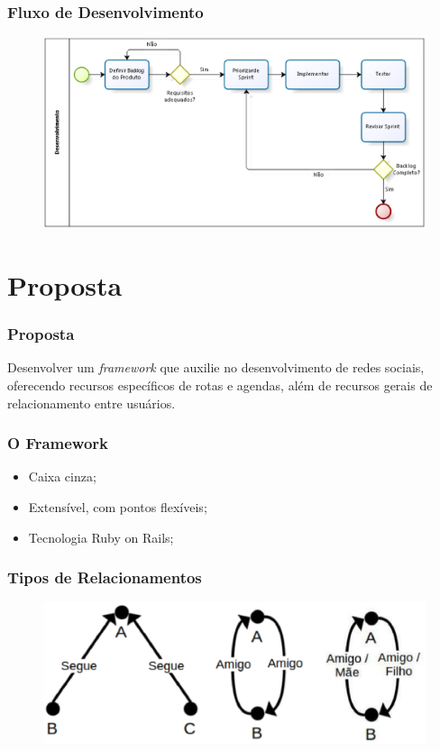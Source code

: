 \documentclass{beamer}
\begin{document}
\begin{frame}
\frametitle{Fluxo de Desenvolvimento}

\begin{figure}[h]
	\centering
	\includegraphics[scale=0.35]{../figuras/capitulo4/processo_desenvolvimento.eps}
\end{figure}

\end{frame}

\section{Proposta}

\begin{frame}
\frametitle{Proposta}

Desenvolver um \textit{framework} que auxilie no desenvolvimento de redes sociais, oferecendo  recursos específicos de rotas e agendas, além de recursos gerais de relacionamento entre usuários.

\end{frame}

\begin{frame}
\frametitle{O Framework}

\begin{itemize}
	\item Caixa cinza;
	\item Extensível, com pontos flexíveis;
	\item Tecnologia Ruby on Rails;
\end{itemize}

\end{frame}

\begin{frame}
\frametitle{Tipos de Relacionamentos}

\begin{figure}[h]
	\centering
	\includegraphics[scale=0.6]{relacionamentos.eps}
\end{figure}

\end{frame}
\end{document}
